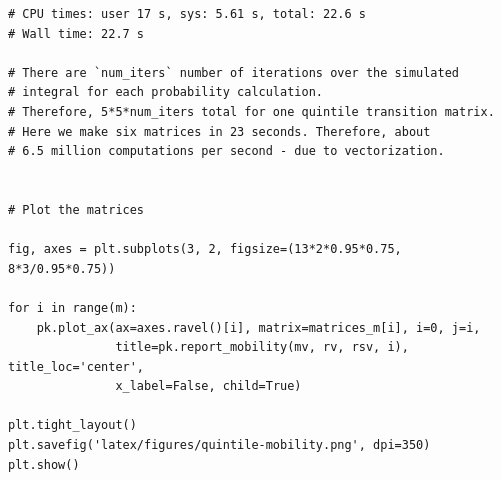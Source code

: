 \documentclass[a4paper,11pt]{article} %
\begin{document}
\begin{verbatim}
# CPU times: user 17 s, sys: 5.61 s, total: 22.6 s
# Wall time: 22.7 s

# There are `num_iters` number of iterations over the simulated 
# integral for each probability calculation.
# Therefore, 5*5*num_iters total for one quintile transition matrix. 
# Here we make six matrices in 23 seconds. Therefore, about 
# 6.5 million computations per second - due to vectorization. 


# Plot the matrices

fig, axes = plt.subplots(3, 2, figsize=(13*2*0.95*0.75, 8*3/0.95*0.75))

for i in range(m):
    pk.plot_ax(ax=axes.ravel()[i], matrix=matrices_m[i], i=0, j=i, 
               title=pk.report_mobility(mv, rv, rsv, i), title_loc='center', 
               x_label=False, child=True)

plt.tight_layout()
plt.savefig('latex/figures/quintile-mobility.png', dpi=350)
plt.show()


\end{verbatim}
\end{document}
